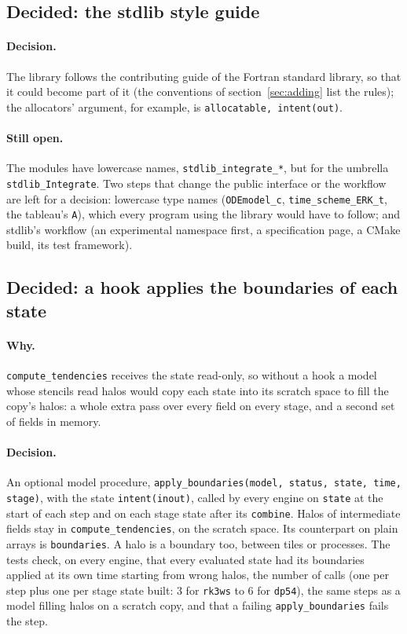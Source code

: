 \documentclass[11pt,a4paper]{article}
\newcommand{\code}[1]{\texttt{#1}}
\begin{document}
\subsection{Decided: the stdlib style guide}

\paragraph{Decision.} The library follows the contributing guide of the
Fortran standard library, so that it could become part of it (the
conventions of section~\ref{sec:adding} list the rules); the allocators'
argument, for example, is \code{allocatable, intent(out)}.

\paragraph{Still open.} The modules have lowercase names,
\code{stdlib\_integrate\_*}, but for the umbrella \code{stdlib\_Integrate}.
Two steps that change the public interface or the workflow are left for a
decision: lowercase type names (\code{ODEmodel\_c}, \code{time\_scheme\_ERK\_t},
the tableau's \code{A}), which every program using the library would have to
follow; and stdlib's workflow (an experimental namespace first, a
specification page, a CMake build, its test framework).

\subsection{Decided: a hook applies the boundaries of each state}

\paragraph{Why.} \code{compute\_tendencies} receives the state read-only, so
without a hook a model whose stencils read halos would copy each state into
its scratch space to fill the copy's halos: a whole extra pass over every
field on every stage, and a second set of fields in memory.

\paragraph{Decision.} An optional model procedure,
\code{apply\_boundaries(model, status, state, time, stage)}, with the state
\code{intent(inout)}, called by every engine on \code{state} at the start of
each step and on each stage state after its \code{combine}. Halos of
intermediate fields stay in \code{compute\_tendencies}, on the scratch space.
Its counterpart on plain arrays is \code{boundaries}. A halo is a boundary
too, between tiles or processes. The tests check, on every engine, that every
evaluated state had its boundaries applied at its own time starting from
wrong halos, the number of calls (one per step plus one per stage state
built: 3 for \code{rk3ws} to 6 for \code{dp54}), the same steps as a model
filling halos on a scratch copy, and that a failing \code{apply\_boundaries}
fails the step.
\end{document}
